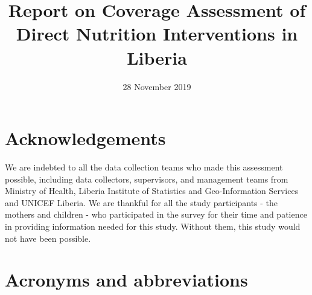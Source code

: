 \documentclass[12pt,a4paper]{article}
\title{Report on Coverage Assessment of Direct Nutrition Interventions in Liberia}
\author{}
\date{28 November 2019}
\begin{document}
\maketitle

\pagebreak 


{
\hypersetup{linkcolor=black}
\setcounter{tocdepth}{3}
\tableofcontents
}
\listoftables
\listoffigures
\newpage

\hypertarget{acknowledgements}{%
\section*{Acknowledgements}\label{acknowledgements}}

We are indebted to all the data collection teams who made this assessment possible, including data collectors, supervisors, and management teams from Ministry of Health, Liberia Institute of Statistics and Geo-Information Services and UNICEF Liberia. We are thankful for all the study participants - the mothers and children - who participated in the survey for their time and patience in providing information needed for this study. Without them, this study would not have been possible.

\newpage

\hypertarget{acronyms-and-abbreviations}{%
\section*{Acronyms and abbreviations}\label{acronyms-and-abbreviations}}
\end{document}
